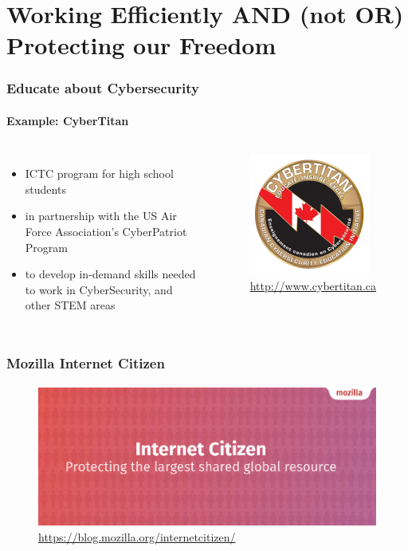 \documentclass{beamer}
\begin{document}
\section[Section]{Working Efficiently AND (not OR) Protecting our Freedom}
	\begin{frame}
	\frametitle{Educate about Cybersecurity}
	\framesubtitle{Example: CyberTitan}
	\begin{columns}
			\begin{itemize}[<+->]
				\item ICTC program for high school students
				\item in partnership with the US Air Force Association’s CyberPatriot Program
				\item to develop in-demand skills needed to work in CyberSecurity, and other STEM areas
			\end{itemize}
	        	\begin{figure}[h]
                	\centering
                	\includegraphics[width=.6\textwidth]{./images/CP_Cybertitan1-150x150}
			\caption{\url{http://www.cybertitan.ca}}
        		\end{figure}
	\end{columns}
	\end{frame}

	\begin{frame}
	\frametitle{Mozilla Internet Citizen}
	\framesubtitle{}
	        \begin{figure}[h]
                \centering
                \includegraphics[width=.8\textwidth]{./images/moz-Internet-citizen}
		\caption{\url{https://blog.mozilla.org/internetcitizen/}}
        	\end{figure}
	\end{frame}
\end{document}
